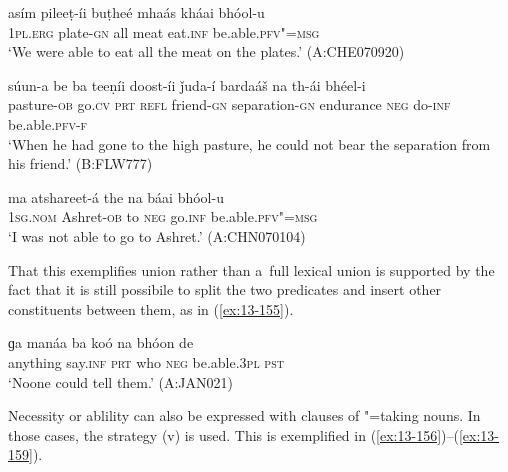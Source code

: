 \begin{exe}
\ex
\label{ex:13-152}
\gll asím pileeṭ-íi buṭheé mhaás kháai bhóol-u \\
\textsc{1pl.erg} plate-\textsc{gn} all meat eat.\textsc{inf} be.able.\textsc{pfv"=msg} \\
\glt `We were able to eat all the meat on the plates.' (A:CHE070920)

\ex
\label{ex:13-153}
\gll súun-a be ba teeṇíi doost-íi  ǰuda-í bardaáš na th-ái bhéel-i \\
pasture-\textsc{ob} go.\textsc{cv} \textsc{prt} \textsc{refl} friend-\textsc{gn} separation-\textsc{gn} endurance \textsc{neg} do-\textsc{inf} be.able.\textsc{pfv-f}  \\
\glt `When he had gone to the high pasture, he could not bear the separation from his friend.' (B:FLW777)

\ex
\label{ex:13-154}
\gll ma atshareet-á the na báai bhóol-u  \\
\textsc{1sg.nom} Ashret-\textsc{ob} to \textsc{neg} go.\textsc{inf} be.able.\textsc{pfv"=msg}  \\
\glt `I was not able to go to Ashret.' (A:CHN070104) 
\end{exe}

That this exemplifies  union rather than a~full lexical union is supported by the fact that it is still possibile to split the two predicates and insert other constituents between them, as in (\ref{ex:13-155}).

\begin{exe}
\ex
\label{ex:13-155}
\gll ɡa manáa ba koó na bhóon de  \\
anything say.\textsc{inf} \textsc{prt} who \textsc{neg} be.able.\textsc{3pl} \textsc{pst}  \\
\glt `Noone could tell them.' (A:JAN021) 
\end{exe}

Necessity or ablility can also be expressed with  clauses of "=taking nouns. In those cases, the  strategy (v) is used. This is exemplified in (\ref{ex:13-156})--(\ref{ex:13-159}).

